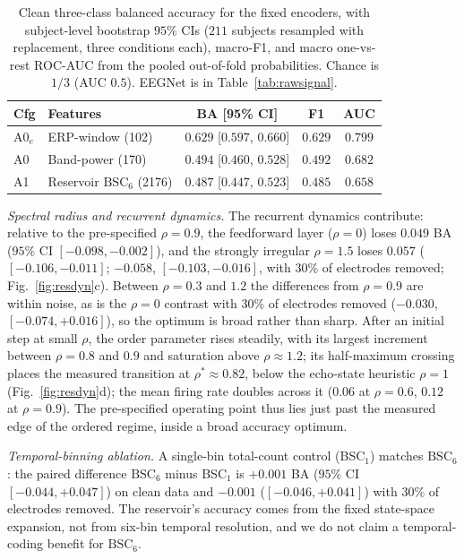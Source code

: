 \documentclass[conference]{IEEEtran}
\newcommand{\BSC}{\ensuremath{\mathrm{BSC}_{6}}}
\begin{document}
\begin{table}[t]
\caption{Clean three-class balanced accuracy for the fixed encoders, with subject-level bootstrap $95\%$ CIs ($211$ subjects resampled with replacement, three conditions each), macro-F1, and macro one-vs-rest ROC-AUC from the pooled out-of-fold probabilities. Chance is $1/3$ (AUC $0.5$). EEGNet is in Table~\ref{tab:rawsignal}.}
\label{tab:clean}
\centering
\small
\setlength{\tabcolsep}{2.5pt}
\begin{tabular}{llccc}
\toprule
Cfg & Features & BA [95\% CI] & F1 & AUC \\
\midrule
A0$_e$ & ERP-window (102) & $0.629$ [$0.597$, $0.660$] & $0.629$ & $0.799$ \\
A0 & Band-power (170) & $0.494$ [$0.460$, $0.528$] & $0.492$ & $0.682$ \\
A1 & Reservoir \BSC{} (2176) & $0.487$ [$0.447$, $0.523$] & $0.485$ & $0.658$ \\
\bottomrule
\end{tabular}
\end{table}

\emph{Spectral radius and recurrent dynamics.} The recurrent dynamics contribute: relative to the pre-specified $\rho=0.9$, the feedforward layer ($\rho=0$) loses $0.049$ BA ($95\%$ CI $[-0.098,-0.002]$), and the strongly irregular $\rho=1.5$ loses $0.057$ ($[-0.106,-0.011]$; $-0.058$, $[-0.103,-0.016]$, with $30\%$ of electrodes removed; Fig.~\ref{fig:resdyn}c). Between $\rho=0.3$ and $1.2$ the differences from $\rho=0.9$ are within noise, as is the $\rho=0$ contrast with $30\%$ of electrodes removed ($-0.030$, $[-0.074,+0.016]$), so the optimum is broad rather than sharp. After an initial step at small $\rho$, the order parameter rises steadily, with its largest increment between $\rho=0.8$ and $0.9$ and saturation above $\rho\approx1.2$; its half-maximum crossing places the measured transition at $\rho^\ast\approx0.82$, below the echo-state heuristic $\rho=1$ (Fig.~\ref{fig:resdyn}d); the mean firing rate doubles across it ($0.06$ at $\rho=0.6$, $0.12$ at $\rho=0.9$). The pre-specified operating point thus lies just past the measured edge of the ordered regime, inside a broad accuracy optimum.

\emph{Temporal-binning ablation.} A single-bin total-count control (BSC$_1$) matches \BSC{}: the paired difference \BSC{} minus BSC$_1$ is $+0.001$ BA ($95\%$ CI $[-0.044,+0.047]$) on clean data and $-0.001$ ($[-0.046,+0.041]$) with $30\%$ of electrodes removed. The reservoir's accuracy comes from the fixed state-space expansion, not from six-bin temporal resolution, and we do not claim a temporal-coding benefit for \BSC{}.
\end{document}
